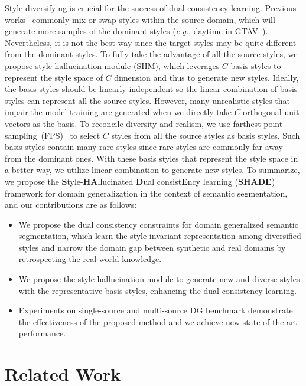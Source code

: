 \documentclass[runningheads]{llncs}
\def\eg{\emph{e.g.}} \def\Eg{\emph{E.g.}}
\newcommand{\ours}{SHADE\xspace}
\begin{document}
Style diversifying is crucial for the success of dual consistency learning.
Previous works~\cite{crossnorm,zhou2021mixstyle} commonly mix or swap styles within the source domain, which will generate more samples of the dominant styles (\eg, daytime in GTAV~\cite{gtav}). Nevertheless, it is not the best way since the target styles may be quite different from the dominant styles. 
To fully take the advantage of all the source styles, we propose style hallucination module (SHM), which leverages $C$ basis styles to represent the style space of $C$ dimension and thus to generate new styles. 
Ideally, the basis styles should be linearly independent so the linear combination of basis styles can represent all the source styles. 
However, many unrealistic styles that impair the model training are generated when we directly take $C$ orthogonal unit vectors as the basis. To reconcile diversity and realism, we use farthest point sampling~(FPS)~\cite{qi2017pointnet++} to select $C$ styles from all the source styles as basis styles. 
Such basis styles contain many rare styles since rare styles are commonly far away from the dominant ones. With these basis styles that represent the style space in a better way, we utilize linear combination to generate new styles.
To summarize, we propose the \textbf{S}tyle-\textbf{HA}llucinated \textbf{D}ual consist\textbf{E}ncy learning (\textbf{\ours}) framework for domain generalization in the context of semantic segmentation, and our contributions are as follows:
\begin{itemize}
    \item We propose the dual consistency constraints for domain generalized semantic segmentation, which learn the style invariant representation among diversified styles and narrow the domain gap between synthetic and real domains by retrospecting the real-world knowledge.
    \item We propose the style hallucination module to generate new and diverse styles with the representative basis styles, enhancing the dual consistency learning.
    \item Experiments on single-source and multi-source DG benchmark demonstrate the effectiveness of the proposed method and we achieve new state-of-the-art performance.
\end{itemize}

\section{Related Work}
\end{document}
